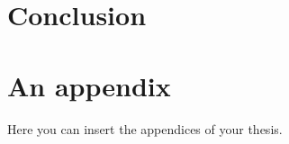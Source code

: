 \documentclass[
  digital, %
  table,   %
  lof,     %
  lot,     %
]{fithesis3}
\begin{document}
\chapter{Conclusion}



  \printbibliography[heading=bibintoc] %

  \makeatletter\thesis@blocks@clear\makeatother
  \printindex

\appendix %
\chapter{An appendix}
Here you can insert the appendices of your thesis.
\end{document}
